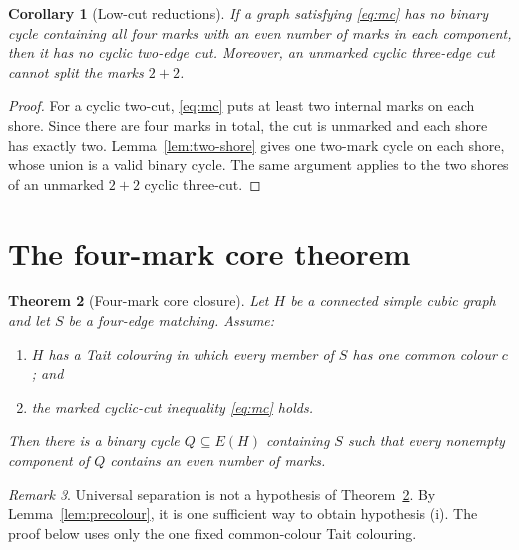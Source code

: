 \documentclass[11pt]{article}
\newtheorem{theorem}{Theorem}[section]
\newtheorem{corollary}[theorem]{Corollary}
\theoremstyle{definition}
\theoremstyle{remark}
\newtheorem{remark}[theorem]{Remark}
\begin{document}
\begin{corollary}[Low-cut reductions]\label{cor:lowcut}
If a graph satisfying \eqref{eq:mc} has no binary cycle containing all
four marks with an even number of marks in each component, then it has
no cyclic two-edge cut.  Moreover, an unmarked cyclic three-edge cut
cannot split the marks \(2+2\).
\end{corollary}

\begin{proof}
For a cyclic two-cut, \eqref{eq:mc} puts at least two internal marks on
each shore.  Since there are four marks in total, the cut is unmarked
and each shore has exactly two.  Lemma~\ref{lem:two-shore} gives one
two-mark cycle on each shore, whose union is a valid binary cycle.  The
same argument applies to the two shores of an unmarked \(2+2\) cyclic
three-cut.
\end{proof}

\section{The four-mark core theorem}

\begin{theorem}[Four-mark core closure]\label{thm:core}
Let \(H\) be a connected simple cubic graph and let \(S\) be a
four-edge matching.  Assume:
\begin{enumerate}[label=(\roman*),leftmargin=2.4em]
\item \(H\) has a Tait colouring in which every member of \(S\) has one
      common colour \(c\); and
\item the marked cyclic-cut inequality \eqref{eq:mc} holds.
\end{enumerate}
Then there is a binary cycle \(Q\subseteq E(H)\) containing \(S\) such
that every nonempty component of \(Q\) contains an even number of marks.
\end{theorem}

\begin{remark}
Universal separation is not a hypothesis of
Theorem~\ref{thm:core}.  By Lemma~\ref{lem:precolour}, it is one
sufficient way to obtain hypothesis (i).  The proof below uses only the
one fixed common-colour Tait colouring.
\end{remark}
\end{document}
